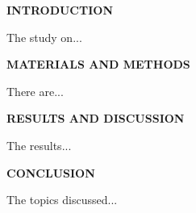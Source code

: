 
\renewcommand{\baselinestretch}{1}
\begin{center}
\end{center}
\newpage
\begin{center}
    \textbf{INTRODUCTION}
\end{center}
The study on...


\begin{center}
    \textbf{MATERIALS AND METHODS}
\end{center}
There are...
\begin{center}
    \textbf{RESULTS AND DISCUSSION}
\end{center}
The results...
\begin{center}
    \textbf{CONCLUSION}
\end{center}
The topics discussed...